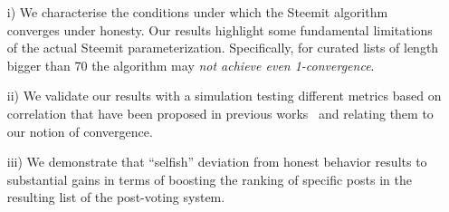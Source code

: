   \begin{itemize}
    \item[i)] We characterise the conditions under which the Steemit algorithm
    converges under honesty. Our results highlight some fundamental limitations
    of the actual Steemit parameterization. Specifically, for curated lists of
    length bigger than 70 the algorithm may {\em not achieve even
    1-convergence}.
    \item[ii)] We validate our results with a simulation testing different
    metrics based on correlation that have been proposed in previous
    works~\cite{kendall1955rank,spearman1904proof} and relating them to our
    notion of convergence.
    \item[iii)] We demonstrate that ``selfish'' deviation from honest behavior
    results to substantial gains in terms of boosting the ranking of specific
    posts in the resulting list of the post-voting system.
  \end{itemize}





